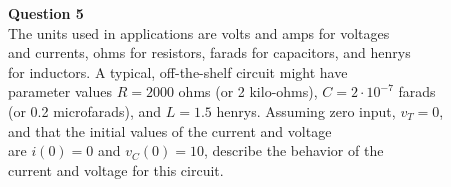 \documentclass[preview]{standalone}
\begin{document}
\begin{center}
\raggedright
                    \textbf{Question 5}\\
                    The units used in applications are volts and amps for voltages \\ 
                    and currents, ohms for resistors, farads for capacitors, and henrys \\
                    for inductors. A typical, off-the-shelf circuit might have \\
                    parameter values $R = 2000$ ohms (or 2 kilo-ohms), $C = 2 · 10^{-7}$  farads \\
                     (or 0.2 microfarads), and $L = 1.5$ henrys. Assuming zero input, $v_T = 0$, \\
                    and that the initial values of the current and voltage \\
                    are $i(0) = 0$ and $v_C(0) = 10$, describe the behavior of the \\
                    current and voltage for this circuit.
\end{center}
\end{document}

